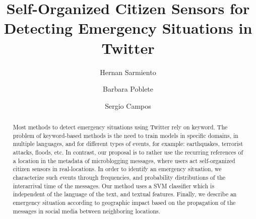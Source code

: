 \documentclass[sigconf]{acmart}
\begin{document}
\title{Self-Organized Citizen Sensors for Detecting Emergency Situations in Twitter}


\author{Hernan Sarmiento}

\author{Barbara Poblete}

\author{Sergio Campos}





\begin{abstract}

Most methods to detect emergency situations using Twitter rely on keyword. The problem of keyword-based methods is the need to train models in specific domains, in multiple languages, and for different types of events, for example: earthquakes, terrorist attacks, floods, etc. In contrast, our proposal is to rather use the recurring references of a location in the metadata of microblogging messages, where users act self-organized citizen sensors in real-locations. In order to identify an emergency situation, we characterize  such events  through frequencies, and probability distributions of the interarrival time of the messages. Our method uses a SVM classifier which is independent of the language of the text, and textual features. Finally, we describe an emergency situation according to geographic impact based on the propagation of the messages in social media between neighboring locations.
\end{abstract}
\end{document}
